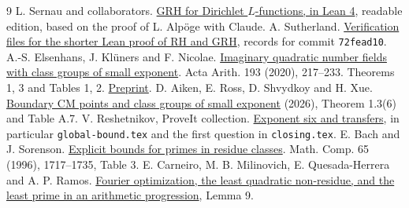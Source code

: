 \documentclass[11pt]{article}
\begin{document}
\begin{thebibliography}{9}\small
{} L. Sernau and collaborators. \href{https://github.com/lsernau/grh-lean/tree/72fead102f663d5c7a407964a13dc0cf9d977207}{GRH for Dirichlet $L$-functions, in Lean 4}, readable edition, based on the proof of L. Alpöge with Claude.
 A. Sutherland. \href{https://math.mit.edu/~drew/shortgrh/}{Verification files for the shorter Lean proof of RH and GRH}, records for commit \texttt{72fead10}.
 A.-S. Elsenhans, J. Klüners and F. Nicolae. \href{https://doi.org/10.4064/aa180220-20-3}{Imaginary quadratic number fields with class groups of small exponent}. Acta Arith. 193 (2020), 217--233. Theorems 1, 3 and Tables 1, 2. \href{https://arxiv.org/abs/1803.02056}{Preprint}.
 D. Aiken, E. Ross, D. Shvydkoy and H. Xue. \href{https://arxiv.org/abs/2605.26020}{Boundary CM points and class groups of small exponent} (2026), Theorem 1.3(6) and Table A.7.
 V. Reshetnikov, ProveIt collection. \href{https://github.com/VladimirReshetnikov/ProveIt/blob/d31039a48d963692e5a5176f47b6603fc9e9d9cf/docs/incoming/grh-exponent-six-and-transfers.zip}{Exponent six and transfers}, in particular \texttt{global-bound.tex} and the first question in \texttt{closing.tex}.
 E. Bach and J. Sorenson. \href{https://doi.org/10.1090/S0025-5718-96-00763-6}{Explicit bounds for primes in residue classes}. Math. Comp. 65 (1996), 1717--1735, Table 3.
 E. Carneiro, M. B. Milinovich, E. Quesada-Herrera and A. P. Ramos. \href{https://arxiv.org/abs/2404.08380}{Fourier optimization, the least quadratic non-residue, and the least prime in an arithmetic progression}, Lemma 9.
\end{thebibliography}
\end{document}
